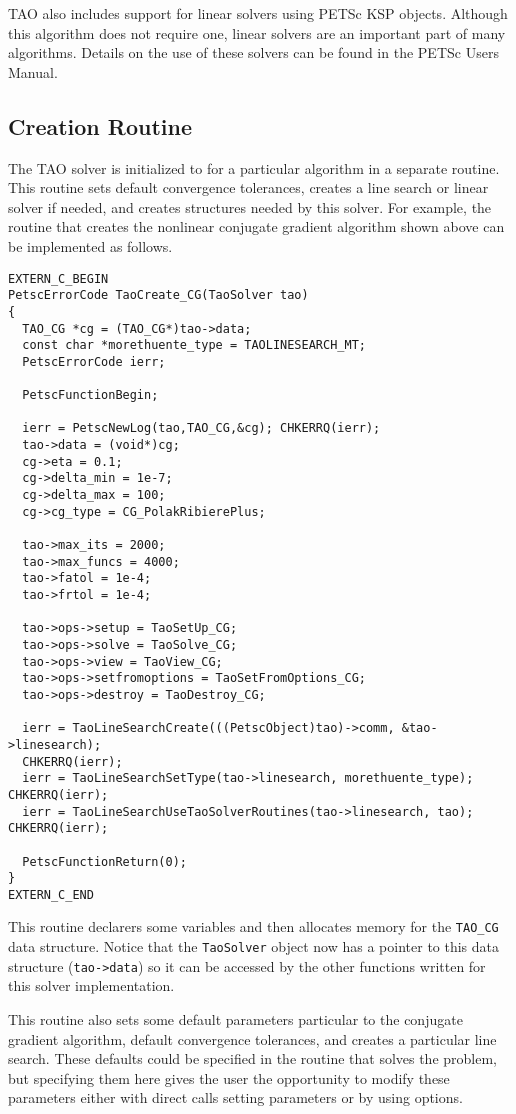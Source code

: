 TAO also includes support for linear solvers using PETSc KSP objects.  
Although this algorithm
does not require one, linear solvers are an important part of many
algorithms.  Details on the use of these solvers can be found in
the PETSc Users Manual.

\subsection{Creation Routine}
The TAO solver is initialized to for a particular algorithm in a separate
routine.  This routine sets default convergence tolerances, creates a
line search or linear solver if needed, and creates structures needed
by this solver.   For example, the routine that creates the nonlinear
conjugate gradient algorithm shown above can be implemented as follows.
\begin{verbatim}
EXTERN_C_BEGIN
PetscErrorCode TaoCreate_CG(TaoSolver tao)
{
  TAO_CG *cg = (TAO_CG*)tao->data;
  const char *morethuente_type = TAOLINESEARCH_MT;
  PetscErrorCode ierr;

  PetscFunctionBegin;

  ierr = PetscNewLog(tao,TAO_CG,&cg); CHKERRQ(ierr);
  tao->data = (void*)cg;
  cg->eta = 0.1;
  cg->delta_min = 1e-7;
  cg->delta_max = 100;
  cg->cg_type = CG_PolakRibierePlus;

  tao->max_its = 2000;
  tao->max_funcs = 4000;
  tao->fatol = 1e-4;
  tao->frtol = 1e-4;

  tao->ops->setup = TaoSetUp_CG;
  tao->ops->solve = TaoSolve_CG;
  tao->ops->view = TaoView_CG;
  tao->ops->setfromoptions = TaoSetFromOptions_CG;
  tao->ops->destroy = TaoDestroy_CG;

  ierr = TaoLineSearchCreate(((PetscObject)tao)->comm, &tao->linesearch);
  CHKERRQ(ierr);
  ierr = TaoLineSearchSetType(tao->linesearch, morethuente_type); CHKERRQ(ierr);
  ierr = TaoLineSearchUseTaoSolverRoutines(tao->linesearch, tao); CHKERRQ(ierr);

  PetscFunctionReturn(0);
}
EXTERN_C_END
\end{verbatim}
This routine declarers some variables and then allocates memory for the 
{\tt TAO\_CG} data structure. Notice that the \texttt{TaoSolver} object 
now has a pointer to this data structure (\texttt{tao->data}) so it can be 
accessed by the other functions written for this solver implementation.

This routine also sets some default parameters particular to the conjugate
gradient algorithm, default convergence tolerances, and creates
a particular line search.
These defaults could be specified in the routine that solves the problem,
but specifying them here gives the user the opportunity to modify these
parameters either with direct calls setting parameters or by using options.

